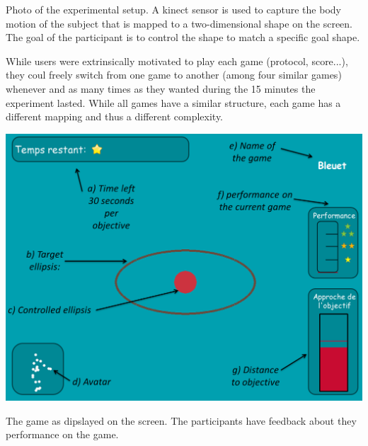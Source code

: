 \documentclass[a0,final, portrait]{inriaposter}
\begin{document}
\begin{multicols}{2}
{{\large Photo of the experimental setup. A kinect sensor is used to capture the body motion of the subject that is mapped to a two-dimensional shape on the screen. The goal of the participant is to control the shape to match a specific goal shape.}

\vspace{2cm}

While users were extrinsically motivated to play each game (protocol, score...), they coul freely switch from one game to another (among four similar games) whenever and as many times as they wanted during the 15 minutes the experiment lasted. While all games have a similar structure, each game has a different mapping and thus a different complexity.

\vspace{2cm}

\begin{center}
    \includegraphics[width=0.9\columnwidth]{images/sc_game_bleuet.PNG}
\end{center}

{\large The game as dipslayed on the screen. The participants have feedback about they performance on the game.}

}

\end{multicols}
\end{document}
